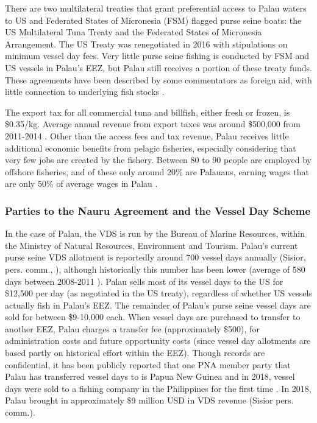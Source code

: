 \documentclass[9pttwoside,lineno]{pnas-new}
\begin{document}
There are two multilateral treaties that grant preferential access to Palau waters to US and Federated States of Micronesia (FSM) flagged purse seine boats: the US Multilateral Tuna Treaty and the Federated States of Micronesia Arrangement.  The US Treaty was renegotiated in 2016 with stipulations on minimum vessel day fees. Very little purse seine fishing is conducted by FSM and US vessels in Palau’s EEZ, but Palau still receives a portion of these treaty funds. These agreements have been described by some commentators as foreign aid, with little connection to underlying fish stocks \cite{Gillett2016}. 

The export tax for all commercial tuna and billfish, either fresh or frozen, is \$0.35/kg. Average annual revenue from export taxes was around \$500,000 from 2011-2014 \citep{Gillett2016}. 
Other than the access fees and tax revenue, Palau receives little additional economic benefits from pelagic fisheries, especially considering that very few jobs are created by the fishery. Between 80 to 90 people are employed by offshore fisheries, and of these only around 20\% are Palauans, earning wages that are only 50\% of average wages in Palau \cite{Gillett2016}.

\subsubsection{Parties to the Nauru Agreement and the Vessel Day Scheme}

In the case of Palau, the VDS is run by the Bureau of Marine Resources, within the Ministry of Natural Resources, Environment and Tourism.
Palau’s current purse seine VDS allotment is reportedly around 700 vessel days annually (Sisior, pers. comm., \cite{Pojas2018}), although historically this number has been lower (average of 580 days between 2008-2011 \citep{Tewid2013}). Palau sells most of its vessel days to the US for \$12,500 per day (as negotiated in the US treaty), regardless of whether US vessels actually fish in Palau’s EEZ. The remainder of Palau’s purse seine vessel days are sold for between \$9-10,000 each. When vessel days are purchased to transfer to another EEZ, Palau charges a transfer fee (approximately \$500), for administration costs and future opportunity costs (since vessel day allotments are based partly on historical effort within the EEZ). Though records are confidential, it has been publicly reported that one PNA member party that Palau has transferred vessel days to is Papua New Guinea \citep{Tewid2013} and in 2018, vessel days were sold to a fishing company in the Philippines for the first time \citep{Pojas2018}. In 2018, Palau brought in approximately \$9 million USD in VDS revenue (Sisior pers. comm.). 
\end{document}
